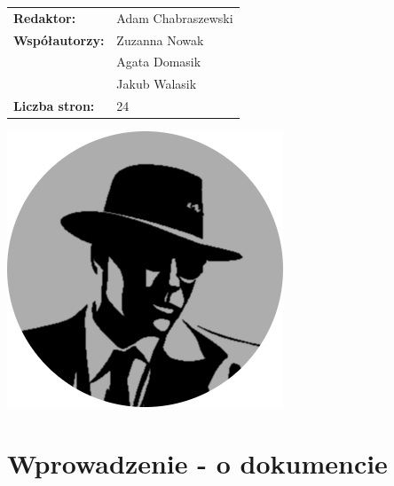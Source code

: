 \documentclass[12pt,a4paper,colorlinks=true,linkcolor=NavyBlue,citecolor=red,urlcolor=NavyBlue]{book}
\begin{document}
\begin{titlepage}
\normalsize
\bigskip
\fontsize{12}{12}\selectfont
\vspace{1.5mm}
\raggedright
\begin{tabular}{ll}
\textbf{Redaktor:} & Adam Chabraszewski \\[6mm]
\textbf{Współautorzy:}
& Zuzanna Nowak \\[2mm]
& Agata Domasik \\[2mm]
& Jakub Walasik \\[6mm]
\textbf{Liczba stron:} & 24 \\[2mm]
\end{tabular}

\vspace{\fill}
\begin{center}
    \includegraphics[scale=0.3]{logo.png} 
\end{center}
\vspace{-15mm}
\end{titlepage}



\tableofcontents

\chapter{Wprowadzenie - o dokumencie}
\end{document}
